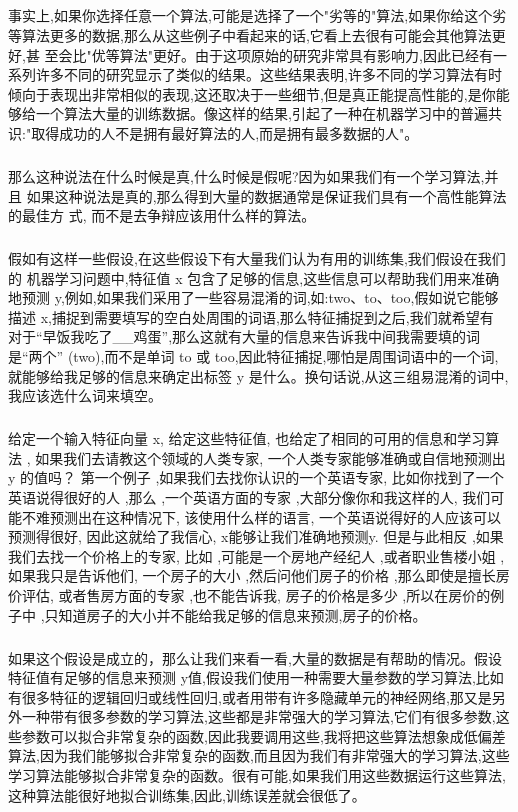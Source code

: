 \documentclass{article}
\begin{document}
\begin{CJK}{UTF8}{gbsn}
\subparagraph{}
事实上,如果你选择任意一个算法,可能是选择了一个"劣等的"算法,如果你给这个劣
等算法更多的数据,那么从这些例子中看起来的话,它看上去很有可能会其他算法更好,甚
至会比"优等算法"更好。由于这项原始的研究非常具有影响力,因此已经有一系列许多不同的研究显示了类似的结果。这些结果表明,许多不同的学习算法有时倾向于表现出非常相似的表现,这还取决于一些细节,但是真正能提高性能的,是你能够给一个算法大量的训练数据。像这样的结果,引起了一种在机器学习中的普遍共识:"取得成功的人不是拥有最好算法的人,而是拥有最多数据的人"。
\begin{figure}[H]
\label{fig:697}
\end{figure}
\subparagraph{}
那么这种说法在什么时候是真,什么时候是假呢?因为如果我们有一个学习算法,并且
如果这种说法是真的,那么得到大量的数据通常是保证我们具有一个高性能算法的最佳方
式, 而不是去争辩应该用什么样的算法。
\begin{figure}[H]
\label{fig:698}
\end{figure}
\subparagraph{}
假如有这样一些假设,在这些假设下有大量我们认为有用的训练集,我们假设在我们的
机器学习问题中,特征值 x 包含了足够的信息,这些信息可以帮助我们用来准确地预测 y,例如,如果我们采用了一些容易混淆的词,如:two、to、too,假如说它能够描述 x,捕捉到需要填写的空白处周围的词语,那么特征捕捉到之后,我们就希望有 对于“早饭我吃了\_{}\_{}鸡蛋”,那么这就有大量的信息来告诉我中间我需要填的词是“两个” (two),而不是单词 to 或 too,因此特征捕捉,哪怕是周围词语中的一个词,就能够给我足够的信息来确定出标签 y 是什么。换句话说,从这三组易混淆的词中,我应该选什么词来填空。
\subparagraph{}
给定一个输入特征向量 x, 给定这些特征值, 也给定了相同的可用的信息和学习算法 ,
如果我们去请教这个领域的人类专家, 一个人类专家能够准确或自信地预测出 y 的值吗？ 第一个例子 ,如果我们去找你认识的一个英语专家, 比如你找到了一个英语说得很好的人 ,那么 ,一个英语方面的专家 ,大部分像你和我这样的人, 我们可能不难预测出在这种情况下, 该使用什么样的语言, 一个英语说得好的人应该可以预测得很好, 因此这就给了我信心, x能够让我们准确地预测y. 但是与此相反 ,如果我们去找一个价格上的专家, 比如 ,可能是一个房地产经纪人 ,或者职业售楼小姐 ,如果我只是告诉他们, 一个房子的大小 ,然后问他们房子的价格 ,那么即使是擅长房价评估, 或者售房方面的专家 ,也不能告诉我, 房子的价格是多少 ,所以在房价的例子中 ,只知道房子的大小并不能给我足够的信息来预测,房子的价格。
\begin{figure}[H]
\label{fig:6666}
\end{figure}
\subparagraph{}
如果这个假设是成立的，那么让我们来看一看,大量的数据是有帮助的情况。假设特征值有足够的信息来预测 y值,假设我们使用一种需要大量参数的学习算法,比如有很多特征的逻辑回归或线性回归,或者用带有许多隐藏单元的神经网络,那又是另外一种带有很多参数的学习算法,这些都是非常强大的学习算法,它们有很多参数,这些参数可以拟合非常复杂的函数,因此我要调用这些,我将把这些算法想象成低偏差算法,因为我们能够拟合非常复杂的函数,而且因为我们有非常强大的学习算法,这些学习算法能够拟合非常复杂的函数。很有可能,如果我们用这些数据运行这些算法,这种算法能很好地拟合训练集,因此,训练误差就会很低了。

\end{CJK}
\end{document}
